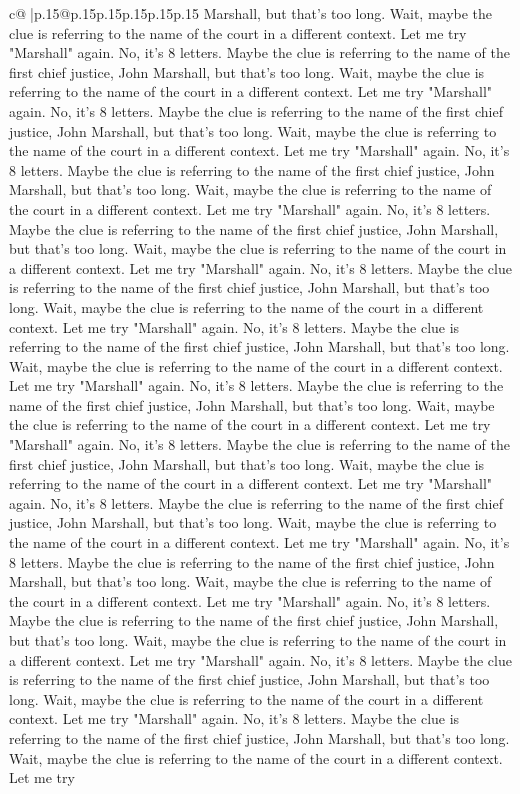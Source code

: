 \documentclass{article}
\begin{document}
{\begin{supertabular}{c@{$\;$}|p{.15\linewidth}@{}p{.15\linewidth}p{.15\linewidth}p{.15\linewidth}p{.15\linewidth}p{.15\linewidth}}
{{{Marshall, but that's too long. Wait, maybe the clue is referring to the name of the court in a different context. Let me try "Marshall" again. No, it's 8 letters. Maybe the clue is referring to the name of the first chief justice, John Marshall, but that's too long. Wait, maybe the clue is referring to the name of the court in a different context. Let me try "Marshall" again. No, it's 8 letters. Maybe the clue is referring to the name of the first chief justice, John Marshall, but that's too long. Wait, maybe the clue is referring to the name of the court in a different context. Let me try "Marshall" again. No, it's 8 letters. Maybe the clue is referring to the name of the first chief justice, John Marshall, but that's too long. Wait, maybe the clue is referring to the name of the court in a different context. Let me try "Marshall" again. No, it's 8 letters. Maybe the clue is referring to the name of the first chief justice, John Marshall, but that's too long. Wait, maybe the clue is referring to the name of the court in a different context. Let me try "Marshall" again. No, it's 8 letters. Maybe the clue is referring to the name of the first chief justice, John Marshall, but that's too long. Wait, maybe the clue is referring to the name of the court in a different context. Let me try "Marshall" again. No, it's 8 letters. Maybe the clue is referring to the name of the first chief justice, John Marshall, but that's too long. Wait, maybe the clue is referring to the name of the court in a different context. Let me try "Marshall" again. No, it's 8 letters. Maybe the clue is referring to the name of the first chief justice, John Marshall, but that's too long. Wait, maybe the clue is referring to the name of the court in a different context. Let me try "Marshall" again. No, it's 8 letters. Maybe the clue is referring to the name of the first chief justice, John Marshall, but that's too long. Wait, maybe the clue is referring to the name of the court in a different context. Let me try "Marshall" again. No, it's 8 letters. Maybe the clue is referring to the name of the first chief justice, John Marshall, but that's too long. Wait, maybe the clue is referring to the name of the court in a different context. Let me try "Marshall" again. No, it's 8 letters. Maybe the clue is referring to the name of the first chief justice, John Marshall, but that's too long. Wait, maybe the clue is referring to the name of the court in a different context. Let me try "Marshall" again. No, it's 8 letters. Maybe the clue is referring to the name of the first chief justice, John Marshall, but that's too long. Wait, maybe the clue is referring to the name of the court in a different context. Let me try "Marshall" again. No, it's 8 letters. Maybe the clue is referring to the name of the first chief justice, John Marshall, but that's too long. Wait, maybe the clue is referring to the name of the court in a different context. Let me try "Marshall" again. No, it's 8 letters. Maybe the clue is referring to the name of the first chief justice, John Marshall, but that's too long. Wait, maybe the clue is referring to the name of the court in a different context. Let me try }}}
\end{supertabular}}
\end{document}
